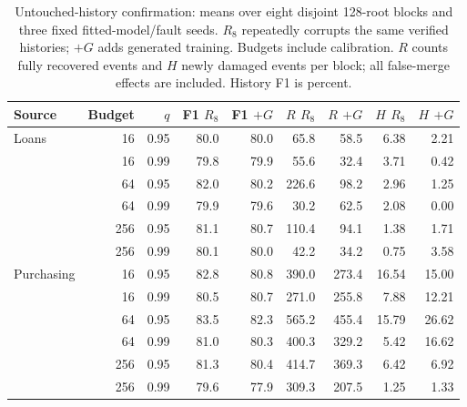 \begin{table}[t]
\centering\small
\setlength{\tabcolsep}{4pt}
\caption{Untouched-history confirmation: means over eight disjoint 128-root blocks and three fixed fitted-model/fault seeds. $R_8$ repeatedly corrupts the same verified histories; $+G$ adds generated training. Budgets include calibration. $R$ counts fully recovered events and $H$ newly damaged events per block; all false-merge effects are included. History F1 is percent.}
\label{tab:fresh-primary}
\begin{tabular}{lrr rr rr rr}
\toprule
Source & Budget & $q$ & F1 $R_8$ & F1 $+G$ & $R$ $R_8$ & $R$ $+G$ & $H$ $R_8$ & $H$ $+G$ \\ \midrule
Loans & 16 & 0.95 & 80.0 & 80.0 & 65.8 & 58.5 & 6.38 & 2.21 \\
 & 16 & 0.99 & 79.8 & 79.9 & 55.6 & 32.4 & 3.71 & 0.42 \\
 & 64 & 0.95 & 82.0 & 80.2 & 226.6 & 98.2 & 2.96 & 1.25 \\
 & 64 & 0.99 & 79.9 & 79.6 & 30.2 & 62.5 & 2.08 & 0.00 \\
 & 256 & 0.95 & 81.1 & 80.7 & 110.4 & 94.1 & 1.38 & 1.71 \\
 & 256 & 0.99 & 80.1 & 80.0 & 42.2 & 34.2 & 0.75 & 3.58 \\
\midrule
Purchasing & 16 & 0.95 & 82.8 & 80.8 & 390.0 & 273.4 & 16.54 & 15.00 \\
 & 16 & 0.99 & 80.5 & 80.7 & 271.0 & 255.8 & 7.88 & 12.21 \\
 & 64 & 0.95 & 83.5 & 82.3 & 565.2 & 455.4 & 15.79 & 26.62 \\
 & 64 & 0.99 & 81.0 & 80.3 & 400.3 & 329.2 & 5.42 & 16.62 \\
 & 256 & 0.95 & 81.3 & 80.4 & 414.7 & 369.3 & 6.42 & 6.92 \\
 & 256 & 0.99 & 79.6 & 77.9 & 309.3 & 207.5 & 1.25 & 1.33 \\
\bottomrule
\end{tabular}
\end{table}
